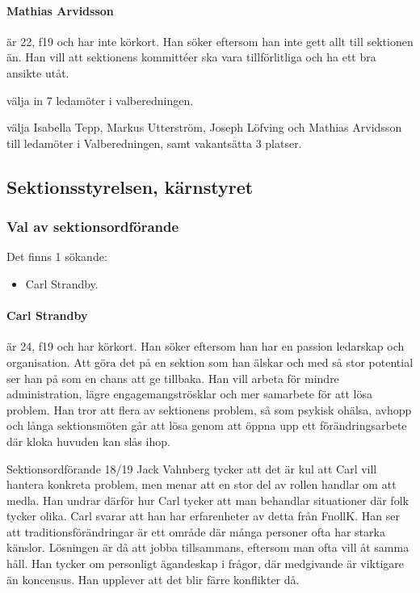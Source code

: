 \documentclass[hidelinks]{sektionsmote}
\begin{document}
\paragraph{Mathias Arvidsson} är 22, f19 och har inte körkort.
Han söker eftersom han inte gett allt till sektionen än.
Han vill att sektionens kommittéer ska vara tillförlitliga och ha ett bra ansikte utåt.

\begin{beslut}
  \item välja in 7 ledamöter i valberedningen.
  \item välja Isabella Tepp, Markus Utterström, Joseph Löfving och Mathias Arvidsson till ledamöter i Valberedningen, samt vakantsätta 3 platser.
\end{beslut}

\subsection{Sektionsstyrelsen, kärnstyret}

\subsubsection{Val av sektionsordförande}
Det finns 1 sökande:
\begin{itemize}
    \item Carl Strandby.
\end{itemize}

\paragraph{Carl Strandby} är 24, f19 och har körkort.
Han söker eftersom han har en passion ledarskap och organisation.
Att göra det på en sektion som han älskar och med så stor potential ser han på som en chans att ge tillbaka.
Han vill arbeta för mindre administration, lägre engagemangströsklar och mer samarbete för att lösa problem.
Han tror att flera av sektionens problem, så som psykisk ohälsa, avhopp och långa sektionsmöten går att lösa genom att öppna upp ett förändringsarbete där kloka huvuden kan slås ihop.

Sektionsordförande 18/19 Jack Vahnberg tycker att det är kul att Carl vill hantera konkreta problem, men menar att en stor del av rollen handlar om att medla.
Han undrar därför hur Carl tycker att man behandlar situationer där folk tycker olika.
Carl svarar att han har erfarenheter av detta från FnollK.
Han ser att traditionsförändringar är ett område där många personer ofta har starka känslor.
Lösningen är då att jobba tillsammans, eftersom man ofta vill åt samma håll.
Han tycker om personligt ägandeskap i frågor, där medgivande är viktigare än koncensus.
Han upplever att det blir färre konflikter då.
\end{document}
